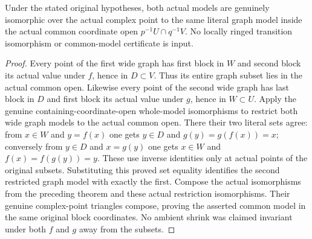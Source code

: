 \begin{theorem}
\label{hir:actual-local-common-graph-model}
\leanok
Under the stated original hypotheses, both actual models are genuinely
isomorphic over the actual complex point to the same literal graph model
inside the actual common coordinate open $p^{-1}U\cap q^{-1}V$.
No locally ringed transition isomorphism or common-model certificate is
input.
\end{theorem}
\begin{proof}
Every point of the first wide graph has first block in $W$ and second
block its actual value under $f$, hence in $D\subset V$. Thus its
entire graph subset lies in the actual common open. Likewise every
point of the second wide graph has last block in $D$ and first block
its actual value under $g$, hence in $W\subset U$. Apply the genuine
containing-coordinate-open whole-model isomorphisms to restrict both
wide graph models to the actual common open. There their two literal
sets agree: from $x\in W$ and $y=f(x)$ one gets $y\in D$ and
$g(y)=g(f(x))=x$; conversely from $y\in D$ and $x=g(y)$ one gets
$x\in W$ and $f(x)=f(g(y))=y$. These use inverse identities only at
actual points of the original subsets. Substituting this proved set
equality identifies the second restricted graph model with exactly the
first. Compose the actual isomorphisms from the preceding theorem and
these actual restriction isomorphisms. Their genuine complex-point
triangles compose, proving the asserted common model in the same original
block coordinates. No ambient shrink was claimed invariant under both
$f$ and $g$ away from the subsets.
\end{proof}

